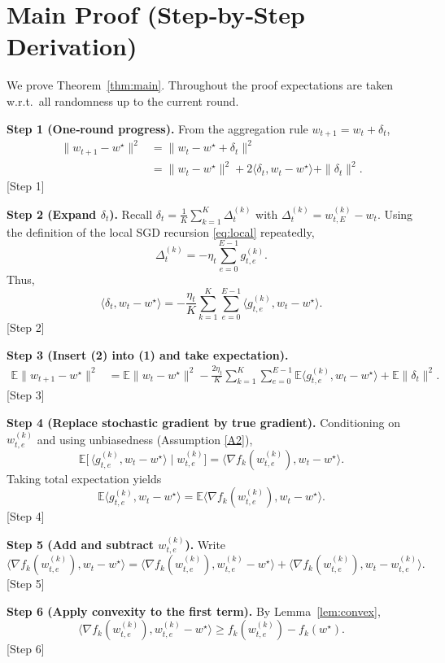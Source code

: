 \documentclass[11pt]{article}
\newcommand{\E}{\mathbb{E}}
\begin{document}
\section*{Main Proof (Step‑by‑Step Derivation)}
We prove Theorem~\ref{thm:main}. Throughout the proof expectations are taken w.r.t.\ all randomness up to the current round.

\medskip
\noindent\textbf{Step 1 (One‑round progress).}  
From the aggregation rule $w_{t+1}=w_t+\delta_t$,
\begin{align}
\|w_{t+1}-w^\star\|^{2}
&= \|w_t-w^\star+\delta_t\|^{2} \nonumber\\
&= \|w_t-w^\star\|^{2}+2\langle\delta_t,w_t-w^\star\rangle+\|\delta_t\|^{2}. \tag{1}
\end{align}
[Step 1]

\medskip
\noindent\textbf{Step 2 (Expand $\delta_t$).}  
Recall $\delta_t=\frac1K\sum_{k=1}^{K}\Delta_{t}^{(k)}$ with $\Delta_{t}^{(k)}=w_{t,E}^{(k)}-w_t$. Using the definition of the local SGD recursion \eqref{eq:local} repeatedly,
\[
\Delta_{t}^{(k)} = -\eta_t\sum_{e=0}^{E-1} g_{t,e}^{(k)} .
\]
Thus,
\[
\langle\delta_t,w_t-w^\star\rangle
= -\frac{\eta_t}{K}\sum_{k=1}^{K}\sum_{e=0}^{E-1}
\langle g_{t,e}^{(k)},w_t-w^\star\rangle . \tag{2}
\]
[Step 2]

\medskip
\noindent\textbf{Step 3 (Insert (2) into (1) and take expectation).}
\begin{align}
\E\|w_{t+1}-w^\star\|^{2}
&= \E\|w_t-w^\star\|^{2}
- \frac{2\eta_t}{K}\sum_{k=1}^{K}\sum_{e=0}^{E-1}
\E\langle g_{t,e}^{(k)},w_t-w^\star\rangle
+ \E\|\delta_t\|^{2}. \tag{3}
\end{align}
[Step 3]

\medskip
\noindent\textbf{Step 4 (Replace stochastic gradient by true gradient).}  
Conditioning on $w_{t,e}^{(k)}$ and using unbiasedness (Assumption \ref{A2}),
\[
\E\big[\,\langle g_{t,e}^{(k)},w_t-w^\star\rangle\mid w_{t,e}^{(k)}\big]
= \langle \nabla f_k(w_{t,e}^{(k)}), w_t-w^\star\rangle .
\]
Taking total expectation yields
\[
\E\langle g_{t,e}^{(k)},w_t-w^\star\rangle
= \E\langle \nabla f_k(w_{t,e}^{(k)}), w_t-w^\star\rangle . \tag{4}
\]
[Step 4]

\medskip
\noindent\textbf{Step 5 (Add and subtract $w_{t,e}^{(k)}$).}  
Write
\[
\langle \nabla f_k(w_{t,e}^{(k)}), w_t-w^\star\rangle
= \langle \nabla f_k(w_{t,e}^{(k)}), w_{t,e}^{(k)}-w^\star\rangle
+ \langle \nabla f_k(w_{t,e}^{(k)}), w_t-w_{t,e}^{(k)}\rangle . \tag{5}
\]
[Step 5]

\medskip
\noindent\textbf{Step 6 (Apply convexity to the first term).}  
By Lemma~\ref{lem:convex},
\[
\langle \nabla f_k(w_{t,e}^{(k)}), w_{t,e}^{(k)}-w^\star\rangle
\ge f_k(w_{t,e}^{(k)})-f_k(w^\star). \tag{6}
\]
[Step 6]
\end{document}
